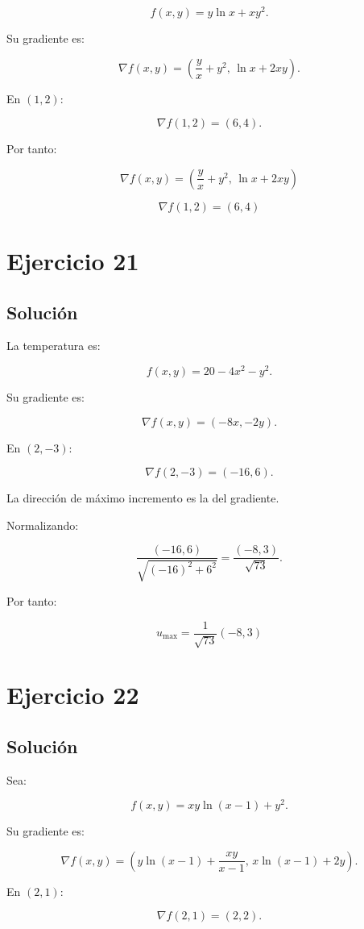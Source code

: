 \documentclass[11pt,a4paper]{article}
\begin{document}
\[
f(x,y)
=
y\ln x+xy^2.
\]

Su gradiente es:

\[
\nabla f(x,y)
=
\left(
\frac yx+y^2,\,
\ln x+2xy
\right).
\]

En \((1,2)\):

\[
\nabla f(1,2)
=
(6,4).
\]

Por tanto:

\[
\boxed{
\nabla f(x,y)
=
\left(
\frac yx+y^2,\,
\ln x+2xy
\right)
}
\]

\[
\boxed{
\nabla f(1,2)=(6,4)
}
\]

\section{Ejercicio 21}
\subsection{Solución}

La temperatura es:

\[
f(x,y)
=
20-4x^2-y^2.
\]

Su gradiente es:

\[
\nabla f(x,y)
=
(-8x,-2y).
\]

En \((2,-3)\):

\[
\nabla f(2,-3)
=
(-16,6).
\]

La dirección de máximo incremento es la del gradiente.

Normalizando:

\[
\frac{(-16,6)}
{\sqrt{(-16)^2+6^2}}
=
\frac{(-8,3)}{\sqrt{73}}.
\]

Por tanto:

\[
\boxed{
u_{\max}
=
\frac1{\sqrt{73}}(-8,3)
}
\]

\section{Ejercicio 22}
\subsection{Solución}

Sea:

\[
f(x,y)
=
xy\ln(x-1)+y^2.
\]

Su gradiente es:

\[
\nabla f(x,y)
=
\left(
y\ln(x-1)+\frac{xy}{x-1},
\,
x\ln(x-1)+2y
\right).
\]

En \((2,1)\):

\[
\nabla f(2,1)
=
(2,2).
\]
\end{document}
